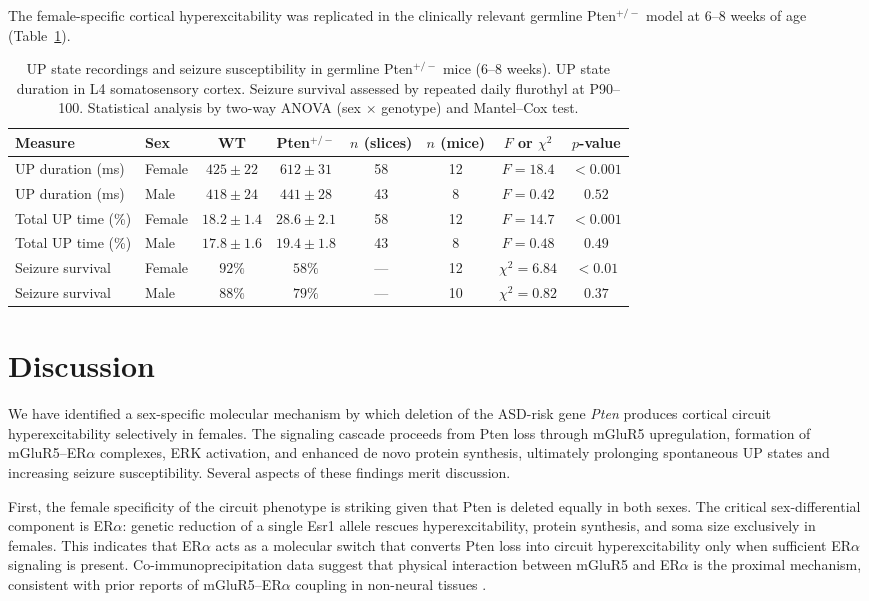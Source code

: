 \documentclass[11pt]{article}
\begin{document}
The female-specific cortical hyperexcitability was replicated in the clinically relevant germline Pten$^{+/-}$ model at 6--8 weeks of age (Table~\ref{tab:germline}).

\begin{table}[H]
\centering
\caption{UP state recordings and seizure susceptibility in germline Pten$^{+/-}$ mice (6--8 weeks). UP state duration in L4 somatosensory cortex. Seizure survival assessed by repeated daily flurothyl at P90--100. Statistical analysis by two-way ANOVA (sex $\times$ genotype) and Mantel--Cox test.}
\label{tab:germline}
\begin{tabular}{llcccccc}
\toprule
\textbf{Measure} & \textbf{Sex} & \textbf{WT} & \textbf{Pten$^{+/-}$} & \textbf{$n$ (slices)} & \textbf{$n$ (mice)} & \textbf{$F$ or $\chi^2$} & \textbf{$p$-value} \\
\midrule
UP duration (ms) & Female & $425 \pm 22$ & $612 \pm 31$ & 58 & 12 & $F = 18.4$ & $< 0.001$ \\
UP duration (ms) & Male & $418 \pm 24$ & $441 \pm 28$ & 43 & 8 & $F = 0.42$ & $0.52$ \\
Total UP time (\%) & Female & $18.2 \pm 1.4$ & $28.6 \pm 2.1$ & 58 & 12 & $F = 14.7$ & $< 0.001$ \\
Total UP time (\%) & Male & $17.8 \pm 1.6$ & $19.4 \pm 1.8$ & 43 & 8 & $F = 0.48$ & $0.49$ \\
Seizure survival & Female & $92\%$ & $58\%$ & --- & 12 & $\chi^2 = 6.84$ & $< 0.01$ \\
Seizure survival & Male & $88\%$ & $79\%$ & --- & 10 & $\chi^2 = 0.82$ & $0.37$ \\
\bottomrule
\end{tabular}
\end{table}

\section{Discussion}

We have identified a sex-specific molecular mechanism by which deletion of the ASD-risk gene \textit{Pten} produces cortical circuit hyperexcitability selectively in females. The signaling cascade proceeds from Pten loss through mGluR5 upregulation, formation of mGluR5--ER$\alpha$ complexes, ERK activation, and enhanced de novo protein synthesis, ultimately prolonging spontaneous UP states and increasing seizure susceptibility. Several aspects of these findings merit discussion.

First, the female specificity of the circuit phenotype is striking given that Pten is deleted equally in both sexes. The critical sex-differential component is ER$\alpha$: genetic reduction of a single Esr1 allele rescues hyperexcitability, protein synthesis, and soma size exclusively in females. This indicates that ER$\alpha$ acts as a molecular switch that converts Pten loss into circuit hyperexcitability only when sufficient ER$\alpha$ signaling is present. Co-immunoprecipitation data suggest that physical interaction between mGluR5 and ER$\alpha$ is the proximal mechanism, consistent with prior reports of mGluR5--ER$\alpha$ coupling in non-neural tissues \citep{lopes2012interaction}.
\end{document}
